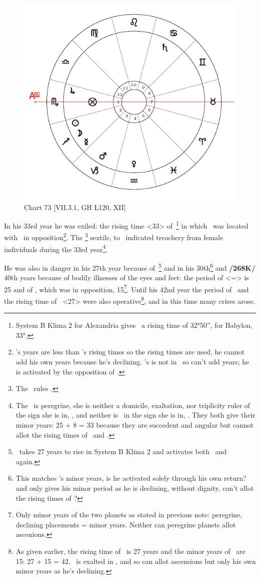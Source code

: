 \begin{figure}
\centering
\vspace{-20pt}
\includegraphics[width=.68\textwidth]{charts/7_3_1}
\caption{Chart 73 [VII.3.1, GH L120, XII]}
\label{fig:chart73}
\end{figure}

In his 33rd year he was exiled: the rising time <33> of \Cancer\,\footnote{System B Klima 2 for Alexandria gives \Cancer\, a rising time of 32°50'', for Babylon, 33°.} in which \Saturn\, was located with \Mars\, in opposition\footnote{\Saturn's years are less than \Cancer's rising times so the rising times are used, he cannot add his own years because he's declining. \Mars's is not in \Cancer\, so can't add years; he is activated by the opposition of \Saturn.}. The \Moon\footnote{The \Moon\, rules \Cancer.} sextile, to \Venus\, indicated treachery from female individuals during the 33rd year\footnote{The \Moon\, is peregrine, she is neither a  domicile, exaltation, nor triplicity ruler of the sign she is in, \Sagittarius, and neither is \Venus\,  in the sign she is in, \Aquarius. They both give their minor years: 25 + 8 = 33 because they are succedent and angular but cannot allot the rising times of \Sagittarius\, and \Aquarius.}. 

He was also in danger in his 27th year because of \Capricorn\,\footnote{\Capricorn\, takes 27 years to rise in System B Klima 2 and activates both \Mars\, and \Saturn\, again.} and in his 30th\footnote{This matches \Saturn's minor years, is he activated solely through his own return? and only gives his minor period as he is declining, without dignity, can't allot the rising times of \Cancer?} and \textbf{/268K/} 40th years because of bodily illnesses of the eyes and feet: the period of \Cancer <=\Moon> is 25 and of \Mars, which was in opposition, 15\footnote{Only minor years of the two planets as stated in previous note: peregrine, declining placements = minor years. Neither can peregrine planets allot ascenions.}. Until his 42nd year the period of \Mars\, and the rising time of \Capricorn\, <27> were also operative\footnote{As given earlier, the rising time of \Capricorn\, is 27 years and the minor years of \Mars\, are 15: 27 + 15 = 42. \Mars\, is exalted in \Capricorn, and so can allot ascensions but only his own minor years as he's declining.}, and in this time many crises arose. 

